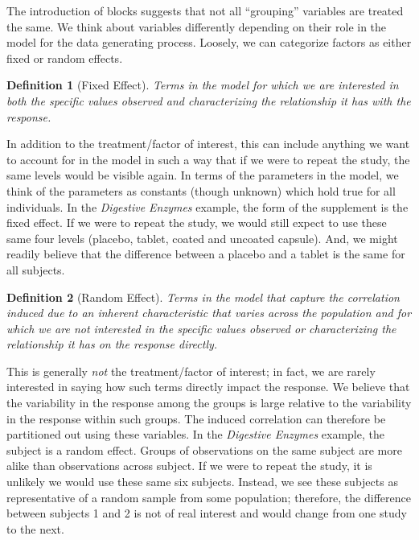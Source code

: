 \documentclass[
]{book}
\theoremstyle{plain}
\theoremstyle{mydefn}
\newtheorem{definition}{Definition}[chapter]
\theoremstyle{myexmpl}
\theoremstyle{remark}
\begin{document}
The introduction of blocks suggests that not all ``grouping'' variables are treated the same. We think about variables differently depending on their role in the model for the data generating process. Loosely, we can categorize factors as either fixed or random effects.

\begin{definition}[Fixed Effect]
Terms in the model for which we are interested in both the specific values observed and characterizing the relationship it has with the response.
\end{definition}

In addition to the treatment/factor of interest, this can include anything we want to account for in the model in such a way that if we were to repeat the study, the same levels would be visible again. In terms of the parameters in the model, we think of the parameters as constants (though unknown) which hold true for all individuals. In the \emph{Digestive Enzymes} example, the form of the supplement is the fixed effect. If we were to repeat the study, we would still expect to use these same four levels (placebo, tablet, coated and uncoated capsule). And, we might readily believe that the difference between a placebo and a tablet is the same for all subjects.

\begin{definition}[Random Effect]
Terms in the model that capture the correlation induced due to an inherent characteristic that varies across the population and for which we are \emph{not} interested in the specific values observed or characterizing the relationship it has on the response directly.
\end{definition}

This is generally \emph{not} the treatment/factor of interest; in fact, we are rarely interested in saying how such terms directly impact the response. We believe that the variability in the response among the groups is large relative to the variability in the response within such groups. The induced correlation can therefore be partitioned out using these variables. In the \emph{Digestive Enzymes} example, the subject is a random effect. Groups of observations on the same subject are more alike than observations across subject. If we were to repeat the study, it is unlikely we would use these same six subjects. Instead, we see these subjects as representative of a random sample from some population; therefore, the difference between subjects 1 and 2 is not of real interest and would change from one study to the next.
\end{document}
